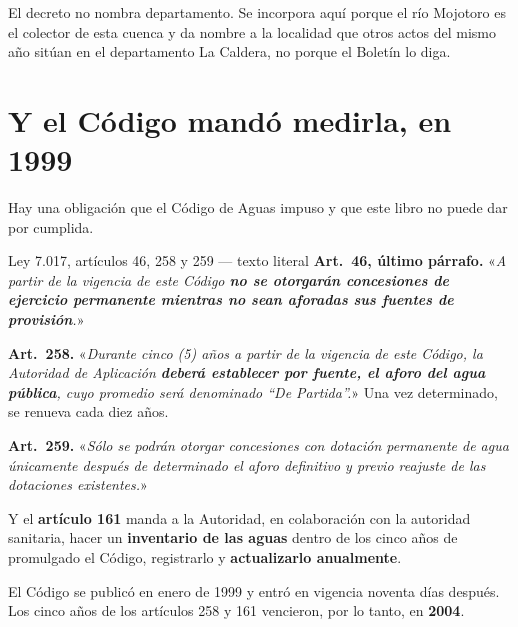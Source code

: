 \begin{cautela}
El decreto no nombra departamento. Se incorpora aquí porque el río Mojotoro es el colector de
esta cuenca y da nombre a la localidad que otros actos del mismo año sitúan en el departamento
La Caldera, no porque el Boletín lo diga. 
\end{cautela}

\section{Y el Código mandó medirla, en 1999}

Hay una obligación que el Código de Aguas impuso y que este libro no puede dar por cumplida.

\begin{ficha}{Ley 7.017, artículos 46, 258 y 259 --- texto literal}
\textbf{Art.\ 46, último párrafo.} «\textit{A partir de la vigencia de este Código \textbf{no se
otorgarán concesiones de ejercicio permanente mientras no sean aforadas sus fuentes de
provisión}.}»

\textbf{Art.\ 258.} «\textit{Durante cinco (5) años a partir de la vigencia de este Código, la
Autoridad de Aplicación \textbf{deberá establecer por fuente, el aforo del agua pública}, cuyo
promedio será denominado ``De Partida''.}» Una vez determinado, se renueva cada diez años.

\textbf{Art.\ 259.} «\textit{Sólo se podrán otorgar concesiones con dotación permanente de agua
únicamente después de determinado el aforo definitivo y previo reajuste de las dotaciones
existentes.}»

Y el \textbf{artículo 161} manda a la Autoridad, en colaboración con la autoridad sanitaria,
hacer un \textbf{inventario de las aguas} dentro de los cinco años de promulgado el Código,
registrarlo y \textbf{actualizarlo anualmente}.
\end{ficha}

El Código se publicó en enero de 1999 y entró en vigencia noventa días después. Los cinco años
de los artículos 258 y 161 vencieron, por lo tanto, en \textbf{2004}.

